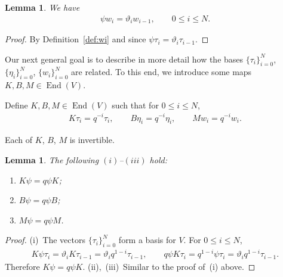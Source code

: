 \documentclass[pdftex]{sigma}
\numberwithin{equation}{section}
\newtheorem{Lemma}[Theorem]{Lemma}
\begin{document}
\begin{Lemma}\label{lem:psiW}
We have
\begin{gather*}
\psi w_i = \vartheta_i w_{i-1}, \qquad 0 \leq i \leq N.
\end{gather*}
\end{Lemma}
\begin{proof} By Definition~\ref{def:wi} and since $\psi \tau_i = \vartheta_i \tau_{i-1}$.
\end{proof}

Our next general goal is to describe in more detail
how the bases
$\lbrace \tau_i\rbrace_{i=0}^N$,
$\lbrace \eta_i\rbrace_{i=0}^N$,
$\lbrace w_i \rbrace_{i=0}^N$ are related.
To this end, we introduce some maps
$K, B, M \in \operatorname{End}(V)$.

\begin{Definition}\label{def:kbm}
\rm Define $K, B, M\in \operatorname{End}(V)$ such that
for $0 \leq i \leq N$,
\begin{gather*}
K \tau_i = q^{-i} \tau_i,
\qquad
B \eta_i = q^{-i} \eta_i,
\qquad
M w_i = q^{-i} w_i.
\end{gather*}
\end{Definition}
Each of $K$, $B$, $M$ is invertible.

\begin{Lemma}\label{lem:KBM}
The following $(i)$--$(iii)$ hold:
\begin{enumerate}\itemsep=0pt
\item[$(i)$]
$K\psi = q \psi K$;
\item[$(ii)$]
$B\psi = q \psi B$;
\item[$(iii)$]
$M\psi = q \psi M$.
\end{enumerate}
\end{Lemma}
\begin{proof} (i)~The vectors
$\lbrace \tau_i\rbrace_{i=0}^N$ form a basis for $V$.
For $0 \leq i \leq N$,
\begin{gather*}
K \psi \tau_i =\vartheta_i K \tau_{i-1} = \vartheta_i q^{1-i} \tau_{i-1},
 \qquad
q \psi K \tau_i = q^{1-i} \psi \tau_i = \vartheta_i q^{1-i} \tau_{i-1}.
\end{gather*}
Therefore $K\psi = q \psi K$.
(ii),~(iii)~Similar to the proof of~(i) above.
\end{proof}
\end{document}
